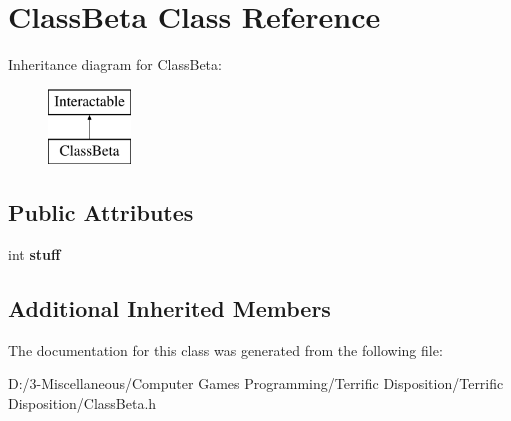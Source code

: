 \hypertarget{class_class_beta}{}\section{Class\+Beta Class Reference}
\label{class_class_beta}
Inheritance diagram for Class\+Beta\+:\begin{figure}[H]
\begin{center}
\leavevmode
\includegraphics[height=2.000000cm]{class_class_beta}
\end{center}
\end{figure}
\subsection*{Public Attributes}
\begin{DoxyCompactItemize}
\item 
\mbox{\label{class_class_beta_ab752ed1a2fc183c0bf76ef2cf856bf17}} 
int {\bfseries stuff}
\end{DoxyCompactItemize}
\subsection*{Additional Inherited Members}


The documentation for this class was generated from the following file\+:\begin{DoxyCompactItemize}
\item 
D\+:/3-\/\+Miscellaneous/\+Computer Games Programming/\+Terrific Disposition/\+Terrific Disposition/Class\+Beta.\+h\end{DoxyCompactItemize}

